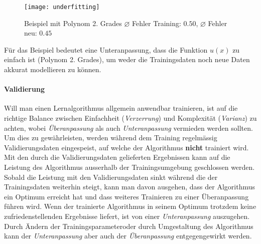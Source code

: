 \begin{figure}[h]
	\centering
	\texttt{[image: underfitting]}
	\caption[Beispiel mit Polynom 2. Grades]{Beispiel mit Polynom 2. Grades $\diameter$ Fehler Training: $0.50$, $\diameter$ Fehler neu: $0.45$}
\end{figure}

Für das Beispiel bedeutet eine Unteranpassung, dass die Funktion $u(x)$ zu einfach ist (Polynom 2. Grades), um weder die Trainingsdaten noch neue Daten akkurat modellieren zu können.

\paragraph{Validierung} Will man einen Lernalgorithmus allgemein anwendbar trainieren, ist auf die richtige Balance zwischen Einfachheit (\textit{Verzerrung}) und Komplexität (\textit{Varianz}) zu achten, wobei \textit{Überanpassung} als auch \textit{Unteranpassung} vermieden werden sollten. Um dies zu gewährleisten, werden während dem Training regelmässig Validierungsdaten eingespeist, auf welche der Algorithmus \textbf{nicht} trainiert wird. Mit den durch die Validierungsdaten gelieferten Ergebnissen kann auf die Leistung des Algorithmus ausserhalb der Trainingsumgebung geschlossen werden. Sobald die Leistung mit den Validierungsdaten sinkt während die der Trainingsdaten weiterhin steigt, kann man davon ausgehen, dass der Algorithmus ein Optimum erreicht hat und dass weiteres Trainieren zu einer Überanpassung führen wird. Wenn der trainierte Algorithmus in seinem Optimum trotzdem keine zufriedenstellenden Ergebnisse liefert, ist von einer \textit{Unteranpassung} auszugehen. Durch Ändern der Trainingsparameter\footnotemark oder durch Umgestaltung des Algorithmus kann der \textit{Unteranpassung} aber auch der \textit{Überanpassung} entgegengewirkt werden.


